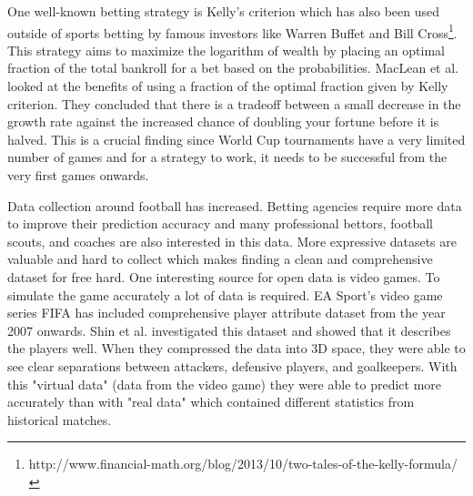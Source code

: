 One well-known betting strategy is Kelly's criterion which has also been used outside of sports betting by famous investors like Warren Buffet and Bill Cross\footnote{http://www.financial-math.org/blog/2013/10/two-tales-of-the-kelly-formula/}. This strategy aims to maximize the logarithm of wealth by placing an optimal fraction of the total bankroll for a bet based on the probabilities. MacLean et al.\cite{maclean1992growth} looked at the benefits of using a fraction of the optimal fraction given by Kelly criterion. They concluded that there is a tradeoff between a small decrease in the growth rate against the increased chance of doubling your fortune before it is halved. This is a crucial finding since World Cup tournaments have a very limited number of games and for a strategy to work, it needs to be successful from the very first games onwards.

Data collection around football has increased. Betting agencies require more data to improve their prediction accuracy and many professional bettors, football scouts, and coaches are also interested in this data. More expressive datasets are valuable and hard to collect which makes finding a clean and comprehensive dataset for free hard. One interesting source for open data is video games. To simulate the game accurately a lot of data is required. EA Sport's video game series FIFA has included comprehensive player attribute dataset from the year 2007 onwards. Shin et al. \cite{shin2014novel} investigated this dataset and showed that it describes the players well. When they compressed the data into 3D space, they were able to see clear separations between attackers, defensive players, and goalkeepers. With this "virtual data" (data from the video game) they were able to predict more accurately than with "real data" which contained different statistics from historical matches.
